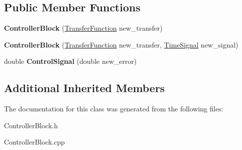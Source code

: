 \subsection*{Public Member Functions}
\begin{DoxyCompactItemize}
\item 
\mbox{\label{classControllerBlock_a1676a574d7548b7e91b02d8e664a5195}} 
{\bfseries Controller\+Block} (\hyperlink{classTransferFunction}{Transfer\+Function} new\+\_\+transfer)
\item 
\mbox{\label{classControllerBlock_ac47b5a7492754f68036a50cd94dee568}} 
{\bfseries Controller\+Block} (\hyperlink{classTransferFunction}{Transfer\+Function} new\+\_\+transfer, \hyperlink{classTimeSignal}{Time\+Signal} new\+\_\+signal)
\item 
\mbox{\label{classControllerBlock_a06aba555897dacf08e99fdae43683b80}} 
double {\bfseries Control\+Signal} (double new\+\_\+error)
\end{DoxyCompactItemize}
\subsection*{Additional Inherited Members}


The documentation for this class was generated from the following files\+:\begin{DoxyCompactItemize}
\item 
Controller\+Block.\+h\item 
Controller\+Block.\+cpp\end{DoxyCompactItemize}
